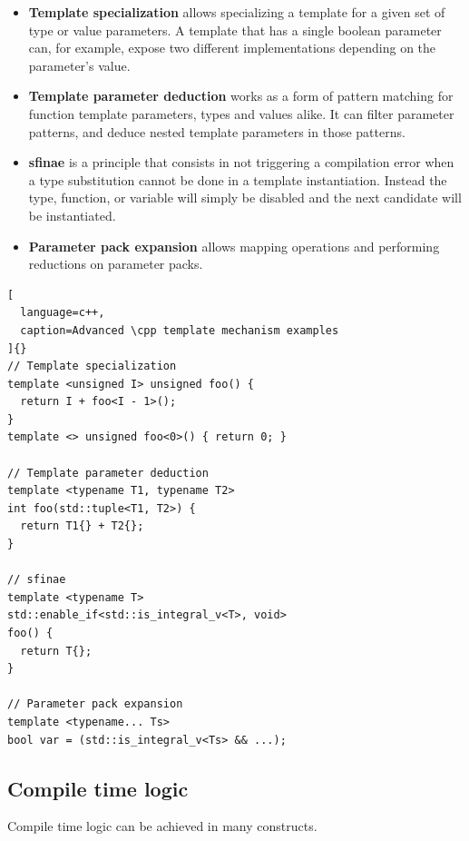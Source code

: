 \documentclass[../main]{subfiles}
\begin{document}
\begin{itemize}
  \item

\textbf{Template specialization} allows specializing a template for a given
set of type or value parameters. A template that has a single boolean parameter
can, for example, expose two different implementations depending on the
parameter's value.

  \item

\textbf{Template parameter deduction} works as a form of pattern matching
for function template parameters, types and values alike. It can filter
parameter patterns, and deduce nested template parameters in those patterns.

  \item

\textbf{\gls{sfinae}} is a \cpp principle that consists in not triggering a
compilation error when a type substitution cannot be done in a template
instantiation. Instead the type, function, or variable will simply be disabled
and the next candidate will be instantiated.

  \item

\textbf{Parameter pack expansion} allows mapping operations and performing
reductions on parameter packs.

\end{itemize}

\begin{lstlisting}[
  language=c++,
  caption=Advanced \cpp template mechanism examples
]{}
// Template specialization
template <unsigned I> unsigned foo() {
  return I + foo<I - 1>();
}
template <> unsigned foo<0>() { return 0; }

// Template parameter deduction
template <typename T1, typename T2>
int foo(std::tuple<T1, T2>) {
  return T1{} + T2{};
}

// sfinae
template <typename T>
std::enable_if<std::is_integral_v<T>, void>
foo() {
  return T{};
}

// Parameter pack expansion
template <typename... Ts>
bool var = (std::is_integral_v<Ts> && ...);
\end{lstlisting}

\subsection{
  Compile time logic
}

Compile time logic can be achieved in many \cpp constructs.
\end{document}
